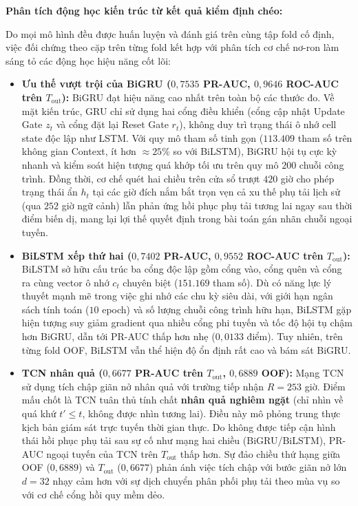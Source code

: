 \noindent\textbf{Phân tích động học kiến trúc từ kết quả kiểm định chéo:}

Do mọi mô hình đều được huấn luyện và đánh giá trên cùng tập fold cố định, việc đối chứng theo cặp trên từng fold kết hợp với phân tích cơ chế nơ-ron làm sáng tỏ các động học hiệu năng cốt lõi:
\begin{itemize}
    \item \textbf{Ưu thế vượt trội của BiGRU ($0{,}7535$ PR-AUC, $0{,}9646$ ROC-AUC trên $T_{\text{out}}$):} BiGRU đạt hiệu năng cao nhất trên toàn bộ các thước đo. Về mặt kiến trúc, GRU chỉ sử dụng hai cổng điều khiển (cổng cập nhật Update Gate $z_t$ và cổng đặt lại Reset Gate $r_t$), không duy trì trạng thái ô nhớ cell state độc lập như LSTM. Với quy mô tham số tinh gọn ($113.409$ tham số trên không gian Context, ít hơn $\approx 25\%$ so với BiLSTM), BiGRU hội tụ cực kỳ nhanh và kiểm soát hiện tượng quá khớp tối ưu trên quy mô $200$ chuỗi công trình. Đồng thời, cơ chế quét hai chiều trên cửa sổ trượt $420$ giờ cho phép trạng thái ẩn $h_t$ tại các giờ đích nắm bắt trọn vẹn cả xu thế phụ tải lịch sử (qua $252$ giờ ngữ cảnh) lẫn phản ứng hồi phục phụ tải tương lai ngay sau thời điểm biến dị, mang lại lợi thế quyết định trong bài toán gán nhãn chuỗi ngoại tuyến.
    \item \textbf{BiLSTM xếp thứ hai ($0{,}7402$ PR-AUC, $0{,}9552$ ROC-AUC trên $T_{\text{out}}$):} BiLSTM sở hữu cấu trúc ba cổng độc lập gồm cổng vào, cổng quên và cổng ra cùng vector ô nhớ $c_t$ chuyên biệt ($151.169$ tham số). Dù có năng lực lý thuyết mạnh mẽ trong việc ghi nhớ các chu kỳ siêu dài, với giới hạn ngân sách tính toán ($10$ epoch) và số lượng chuỗi công trình hữu hạn, BiLSTM gặp hiện tượng suy giảm gradient qua nhiều cổng phi tuyến và tốc độ hội tụ chậm hơn BiGRU, dẫn tới PR-AUC thấp hơn nhẹ ($0{,}0133$ điểm). Tuy nhiên, trên từng fold OOF, BiLSTM vẫn thể hiện độ ổn định rất cao và bám sát BiGRU.
    \item \textbf{TCN nhân quả ($0{,}6677$ PR-AUC trên $T_{\text{out}}$, $0{,}6889$ OOF):} Mạng TCN sử dụng tích chập giãn nở nhân quả với trường tiếp nhận $R = 253$ giờ. Điểm mấu chốt là TCN tuân thủ tính chất \textbf{nhân quả nghiêm ngặt} (chỉ nhìn về quá khứ $t' \leq t$, không được nhìn tương lai). Điều này mô phỏng trung thực kịch bản giám sát trực tuyến thời gian thực. Do không được tiếp cận hình thái hồi phục phụ tải sau sự cố như mạng hai chiều (BiGRU/BiLSTM), PR-AUC ngoại tuyến của TCN trên $T_{\text{out}}$ thấp hơn. Sự đảo chiều thứ hạng giữa OOF ($0{,}6889$) và $T_{\text{out}}$ ($0{,}6677$) phản ánh việc tích chập với bước giãn nở lớn $d=32$ nhạy cảm hơn với sự dịch chuyển phân phối phụ tải theo mùa vụ so với cơ chế cổng hồi quy mềm dẻo.

\end{itemize}
